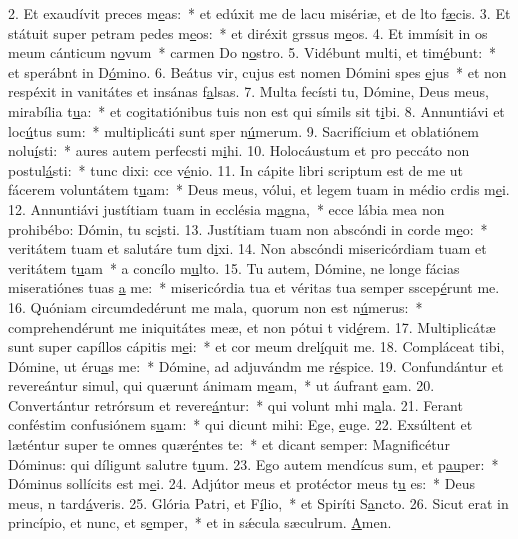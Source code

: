 2. Et exaudívit preces m\uline{e}as:~* et edúxit me de lacu misériæ, et de lto f\uline{æ}cis.
3. Et státuit super petram pedes m\uline{e}os:~* et diréxit grssus m\uline{e}os.
4. Et immísit in os meum cánticum n\uline{o}vum~* carmen Do n\uline{o}stro.
5. Vidébunt multi, et tim\uline{é}bunt:~* et sperábnt in D\uline{ó}mino.
6. Beátus vir, cujus est nomen Dómini spes \uline{e}jus~* et non respéxit in vanitátes et insánas f\uline{a}lsas.
7. Multa fecísti tu, Dómine, Deus meus, mirabília t\uline{u}a:~* et cogitatiónibus tuis non est qui símils sit t\uline{i}bi.
8. Annuntiávi et loc\uline{ú}tus sum:~* multiplicáti sunt sper n\uline{ú}merum.
9. Sacrifícium et oblatiónem nolu\uline{í}sti:~* aures autem perfecsti m\uline{i}hi.
10. Holocáustum et pro peccáto non postul\uline{á}sti:~* tunc dixi: cce v\uline{é}nio.
11. In cápite libri scriptum est de me ut fácerem voluntátem t\uline{u}am:~* Deus meus, vólui, et legem tuam in médio crdis m\uline{e}i.
12. Annuntiávi justítiam tuam in ecclésia m\uline{a}gna,~* ecce lábia mea non prohibébo: Dómin, tu sc\uline{i}sti.
13. Justítiam tuam non abscóndi in corde m\uline{e}o:~* veritátem tuam et salutáre tum d\uline{i}xi.
14. Non abscóndi misericórdiam tuam et veritátem t\uline{u}am~* a concílo m\uline{u}lto.
15. Tu autem, Dómine, ne longe fácias miseratiónes tuas \uline{a} me:~* misericórdia tua et véritas tua semper sscep\uline{é}runt me.
16. Quóniam circumdedérunt me mala, quorum non est n\uline{ú}merus:~* comprehendérunt me iniquitátes meæ, et non pótui t vid\uline{é}rem.
17. Multiplicátæ sunt super capíllos cápitis m\uline{e}i:~* et cor meum drel\uline{í}quit me.
18. Compláceat tibi, Dómine, ut éru\uline{a}s me:~* Dómine, ad adjuvándm me r\uline{é}spice.
19. Confundántur et revereántur simul, qui quærunt ánimam m\uline{e}am,~* ut áufrant \uline{e}am.
20. Convertántur retrórsum et revere\uline{á}ntur:~* qui volunt mhi m\uline{a}la.
21. Ferant conféstim confusiónem s\uline{u}am:~* qui dicunt mihi: Ege, \uline{e}uge.
22. Exsúltent et læténtur super te omnes quær\uline{é}ntes te:~* et dicant semper: Magnificétur Dóminus: qui díligunt salutre t\uline{u}um.
23. Ego autem mendícus sum, et p\uline{au}per:~* Dóminus sollícits est m\uline{e}i.
24. Adjútor meus et protéctor meus t\uline{u} es:~* Deus meus, n tard\uline{á}veris.
25. Glória Patri, et F\uline{í}lio,~* et Spiríti S\uline{a}ncto.
26. Sicut erat in princípio, et nunc, et s\uline{e}mper,~* et in sǽcula sæculrum. \uline{A}men.
